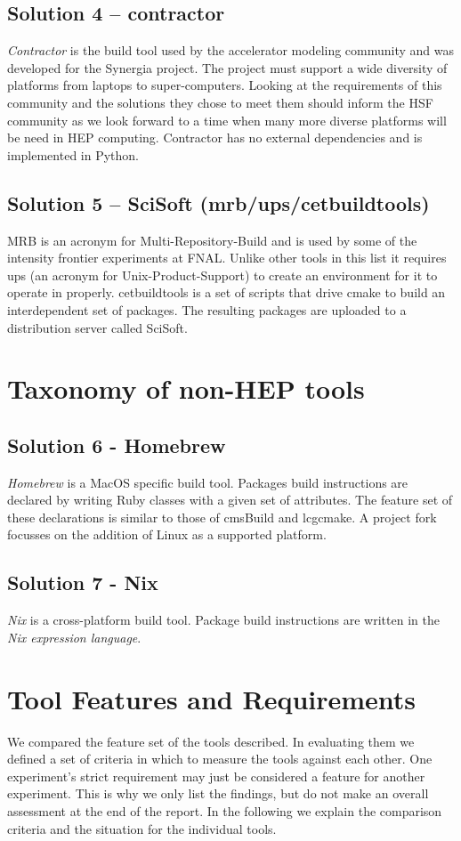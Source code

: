 \documentclass[12pt,a4paper]{article}
\begin{document}
\subsection{Solution 4 -- contractor} 
\emph{Contractor} is the build tool used by the accelerator modeling community and was developed for the Synergia project.  The project must support a wide diversity of platforms from laptops to super-computers.  Looking at the requirements of this community and the solutions they chose to meet them should inform the HSF community as we look forward to a time when many more diverse platforms will be need in HEP computing.  Contractor has no external dependencies and is implemented in Python.

\subsection{Solution 5 -- SciSoft (mrb/ups/cetbuildtools)}
MRB is an acronym for Multi-Repository-Build and is used by some of the intensity frontier experiments at FNAL. Unlike other tools in this list it requires ups (an acronym for Unix-Product-Support) to create an environment for it to operate in properly.  cetbuildtools is a set of scripts that drive cmake to build an interdependent set of packages.  The resulting packages are uploaded to a distribution server called SciSoft.


\section{Taxonomy of non-HEP tools}
\subsection{Solution 6 - Homebrew }
\emph{Homebrew}\cite{homebrew} is a MacOS specific build tool. Packages build instructions are declared by writing Ruby classes with a given set of attributes. The feature set of these declarations is similar to those of cmsBuild and lcgcmake. A project fork focusses on the addition of Linux as a supported platform.

\subsection{Solution 7 - Nix }
\emph{Nix}\cite{nix} is a cross-platform build tool. Package build instructions are written in the \emph{Nix expression language}.

\section{Tool Features and Requirements}
We compared the feature set of the tools described. In evaluating them we defined a set of criteria in which to measure the tools against each other.  One experiment's strict requirement may just be considered a feature for another experiment. This is why we only list the findings, but do not make an overall assessment at the end of the report. In the following we explain the comparison criteria and the situation for the individual tools.
\end{document}
